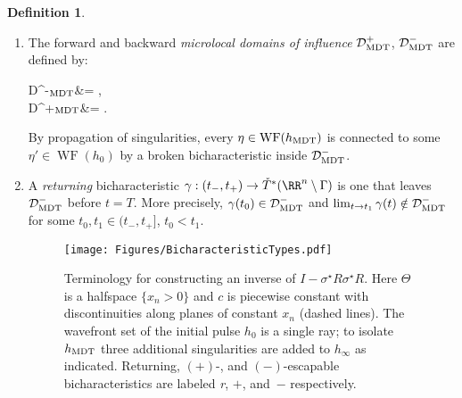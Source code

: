 \documentclass[10pt]{article}
\theoremstyle{plain}
\theoremstyle{definition}
\newtheorem*{defn}{Definition}
\theoremstyle{remark}
\numberwithin{theorem}{section}
\numberwithin{example}{section}
\numberwithin{equation}{section}
\numberwithin{figure}{section}
\newcommand\To{\smash{\mathring T}\vphantom{T}}			%
\DeclareMathOperator\WF{WF}		%
\newcommand\MDT{\ensuremath{_{\text{\normalfont MDT}}}}	%
\begin{document}
\begin{defn}\hfill
	\renewcommand\labelenumi{(\alph{enumi})}
	\renewcommand\labelenumii{\roman{enumii}.}
	\begin{enumerate}
		\item The forward and backward \emph{microlocal domains of influence} $\mathcal D^+\MDT$, $\mathcal D^-\MDT$ are defined by:
		\begin{nalign}
			\mathcal D^-\MDT &= \set{(t,\eta)\in[0,T]\times \To^*\RR^n}{d^*_{T^*\Theta'}(\eta)>t}\!,\\
			\mathcal D^+\MDT &= \set{(t,\eta)\in[T,2T]\times \To^*\RR^n}{d^*_{T^*\Theta'}(\eta)>2T-t}\!.
		\end{nalign}
		By propagation of singularities, every $\eta\in\WF(h\MDT)$ is connected to some $\eta'\in\WF(h_0)$ by a broken bicharacteristic inside $\mathcal D^-\MDT$.
		\item A \emph{returning} bicharacteristic $\gamma:(t_-,t_+)\to\To^*(\RR^n\setminus\Gamma)$ is one that leaves $\mathcal D^-\MDT$ before $t=T$. More precisely, $\gamma(t_0)\in\mathcal D^-\MDT$ and $\lim_{t\to t_1}\gamma(t)\notin\mathcal D^-\MDT$ for some $t_0,t_1\in(t_-,t_+]$, $t_0<t_1$.
		
		
\begin{figure}
	\centering
	\texttt{[image: Figures/BicharacteristicTypes.pdf]}
	
	\caption{Terminology for constructing an inverse of $I-\sigma^\star R\sigma^\star R$. Here $\Theta$ is a halfspace $\{x_n>0\}$ and $c$ is piecewise constant with discontinuities along planes of constant $x_n$ (dashed lines). The wavefront set of the initial pulse $h_0$ is a single ray; to isolate $h\MDT$ three additional singularities are added to $h_\infty$ as indicated.
	Returning, $(+)$-, and $(-)$-escapable bicharacteristics are labeled \textit r, $+$, and~$-$ respectively.}
	\label{f:ml-constructive-terms}
\end{figure}

		
		

\end{enumerate}
\end{defn}
\end{document}
